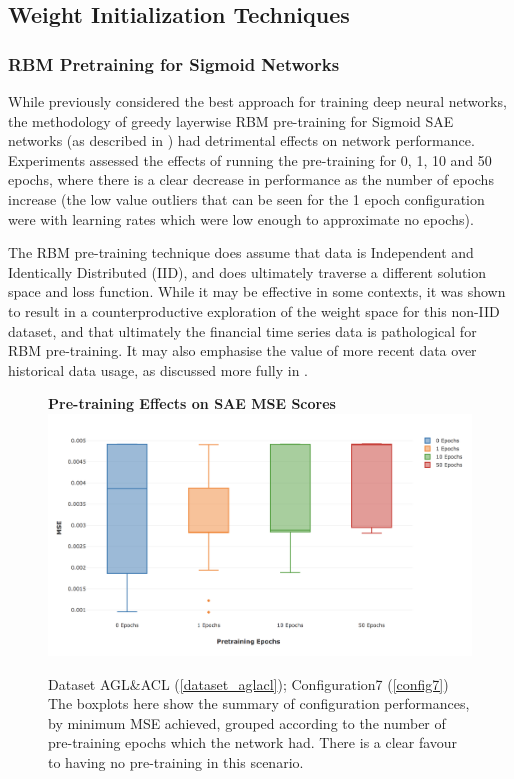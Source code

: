 \documentclass[a4paper,11pt,oneside]{article}
\theoremstyle{plain}
\theoremstyle{definition}
\begin{document}
\newpage
\subsection{Weight Initialization Techniques}\label{results_init}

\subsubsection{RBM Pretraining for Sigmoid Networks}

While previously considered the best approach for training deep neural networks, the methodology of greedy layerwise RBM pre-training for Sigmoid SAE networks (as described in \cite{Hinton2}) had detrimental effects on network performance. Experiments assessed the effects of running the pre-training for 0, 1, 10 and 50 epochs, where there is a clear decrease in performance as the number of epochs increase (the low value outliers that can be seen for the 1 epoch configuration were with learning rates which were low enough to approximate no epochs). \newline

The RBM pre-training technique does assume that data is Independent and Identically Distributed (IID), and does ultimately traverse a different solution space and loss function. While it may be effective in some contexts, it was shown to result in a counterproductive exploration of the weight space for this non-IID dataset, and that ultimately the financial time series data is pathological for RBM pre-training. It may also emphasise the value of more recent data over historical data usage, as discussed more fully in . \newline

\begin{figure}[H]
	\centering
	\textbf{Pre-training Effects on SAE MSE Scores} 
	\includegraphics[scale=0.35]{images/results/init/Pretraining.png}
	\caption{Dataset AGL\&ACL (\ref{dataset_aglacl}); Configuration7 (\ref{config7})
		\newline \newline The boxplots here show the summary of configuration performances, by minimum MSE achieved, grouped according to the number of pre-training epochs which the network had. There is a clear favour to having no pre-training in this scenario.}
	\label{figure-results-pretraining-effect}
\end{figure}		
\end{document}
